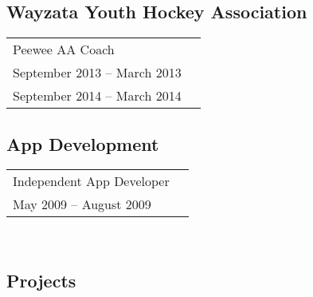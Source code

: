 \documentclass{article}[11pt]
\begin{document}
	\subsection*{Wayzata Youth Hockey Association}
	\begin{tabular}{l l}
	Peewee AA Coach 		& \\
	September 2013 -- March 2013 	& \\
	September 2014 -- March 2014 	& \\
	\end{tabular}
	\subsection*{App Development}
	\begin{tabular}{l l}
	Independent App Developer	& \\
	May 2009 -- August 2009 	& \\
	\end{tabular}\\
\begin{multicols}{2}
	\section*{Projects}
		\vfill
		\columnbreak
\end{multicols}

\begin{comment}

\end{comment}
\end{document}
